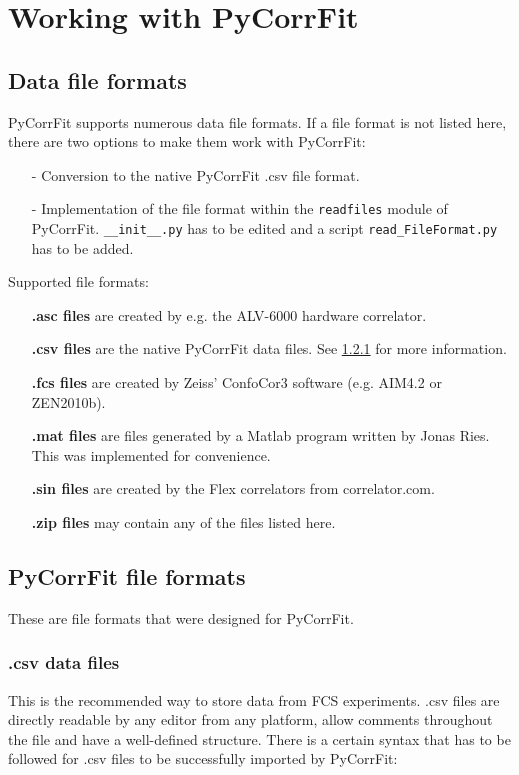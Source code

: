 \section{Working with PyCorrFit}
\subsection{Data file formats}
\label{sec:fileformats}
PyCorrFit supports numerous data file formats. If a file format is not listed here, there are two options to make them work with PyCorrFit:
\begin{itemize}
\item[-] Conversion to the native PyCorrFit \mytilde .csv file format.
\item[-] Implementation of the file format within the \texttt{readfiles} module of PyCorrFit. \texttt{\_\_init\_\_.py} has to be edited and a script \texttt{read\_FileFormat.py} has to be added.
\end{itemize}

Supported file formats:
\begin{itemize}
\item[] \textbf{\mytilde .asc files} are created by e.g. the ALV-6000 hardware correlator.
\item[] \textbf{\mytilde .csv files} are the native PyCorrFit data files. See \ref{text:csv} for more information.
\item[] \textbf{\mytilde .fcs files} are created by Zeiss' ConfoCor3 software (e.g. AIM4.2 or ZEN2010b).
\item[] \textbf{\mytilde .mat files} are files generated by a Matlab program written by Jonas Ries. This was implemented for convenience.
\item[] \textbf{\mytilde .sin files} are created by the Flex correlators from correlator.com.
\item[] \textbf{\mytilde .zip files} may contain any of the files listed here.
\end{itemize}

\subsection{PyCorrFit file formats}
These are file formats that were designed for PyCorrFit.


\subsubsection{.csv data files}
\label{text:csv}
This is the recommended way to store data from FCS experiments. \mytilde .csv files are directly readable by any editor from any platform, allow comments throughout the file and have a well-defined structure. There is a certain syntax that has to be followed for \mytilde .csv files to be successfully imported by PyCorrFit:


